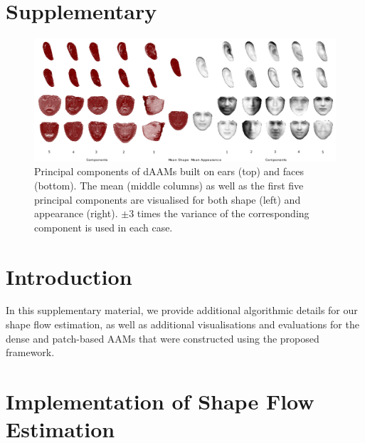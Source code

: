 \section{Supplementary}
\begin{figure}[!b]
\centering
\includegraphics[width=\textwidth]{resources/Suplementory_Meterial/Models/models}
\caption{Principal components of dAAMs built on ears (top) and faces (bottom). The mean (middle columns) as well as the first five principal components are visualised for both shape (left) and appearance (right). $\pm 3$ times the variance of the corresponding component is used in each case.}
\label{fig:pcamodel}
\end{figure}


\section{Introduction}
In this supplementary material, we provide additional algorithmic details for our shape flow estimation, as well as additional visualisations and evaluations for the dense and patch-based AAMs that were constructed using the proposed framework.

\section{Implementation of Shape Flow Estimation}
\label{sec:cost_function}


